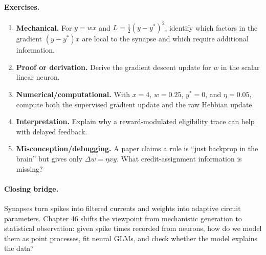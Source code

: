 \paragraph{Exercises.}
\begin{enumerate}[label=\textbf{45.4.\arabic*.}, leftmargin=*]
\item \textbf{Mechanical.} For \(y=wx\) and \(L=\frac12(y-y^*)^2\), identify which factors in the gradient \((y-y^*)x\) are local to the synapse and which require additional information.
\item \textbf{Proof or derivation.} Derive the gradient descent update for \(w\) in the scalar linear neuron.
\item \textbf{Numerical/computational.} With \(x=4\), \(w=0.25\), \(y^*=0\), and \(\eta=0.05\), compute both the supervised gradient update and the raw Hebbian update.
\item \textbf{Interpretation.} Explain why a reward-modulated eligibility trace can help with delayed feedback.
\item \textbf{Misconception/debugging.} A paper claims a rule is ``just backprop in the brain'' but gives only \(\Delta w=\eta xy\). What credit-assignment information is missing?
\end{enumerate}

\paragraph{Closing bridge.}
Synapses turn spikes into filtered currents and weights into adaptive circuit parameters. Chapter 46 shifts the viewpoint from mechanistic generation to statistical observation: given spike times recorded from neurons, how do we model them as point processes, fit neural GLMs, and check whether the model explains the data?

\clearpage
